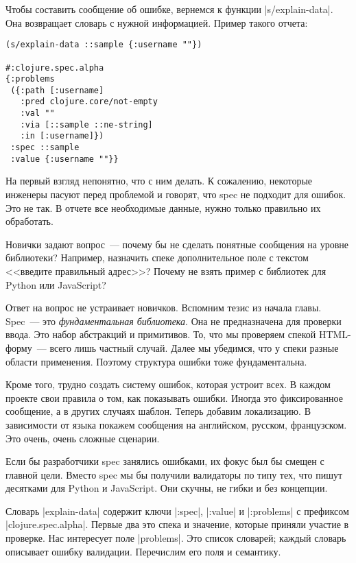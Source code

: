 Чтобы составить сообщение об ошибке, вернемся к функции \spverb|s/explain-data|.
Она возвращает словарь с нужной информацией. Пример такого отчета:

\begin{verbatim}
(s/explain-data ::sample {:username ""})

#:clojure.spec.alpha
{:problems
 ({:path [:username]
   :pred clojure.core/not-empty
   :val ""
   :via [::sample ::ne-string]
   :in [:username]})
 :spec ::sample
 :value {:username ""}}
\end{verbatim}

На первый взгляд непонятно, что с ним делать. К сожалению, некоторые инженеры
пасуют перед проблемой и говорят, что spec не подходит для ошибок. Это не так. В
отчете все необходимые данные, нужно только правильно их обработать.

Новички задают вопрос~--- почему бы не сделать понятные сообщения на уровне
библиотеки? Например, назначить спеке дополнительное поле с текстом <<введите
правильный адрес>>? Почему не взять пример с библиотек для Python или
JavaScript?

Ответ на вопрос не устраивает новичков. Вспомним тезис из начала главы. Spec~---
это \emph{фундаментальная библиотека}. Она не предназначена для проверки
ввода. Это набор абстракций и примитивов. То, что мы проверяем спекой
HTML-форму~--- всего лишь частный случай. Далее мы убедимся, что у спеки разные
области применения. Поэтому структура ошибки тоже фундаментальна.

Кроме того, трудно создать систему ошибок, которая устроит всех. В каждом
проекте свои правила о том, как показывать ошибки. Иногда это фиксированное
сообщение, а в других случаях шаблон. Теперь добавим локализацию. В зависимости
от языка покажем сообщения на английском, русском, французском. Это очень, очень
сложные сценарии.

Если бы разработчики spec занялись ошибками, их фокус был бы смещен с главной
цели. Вместо spec мы бы получили валидаторы по типу тех, что пишут десятками для
Python и JavaScript. Они скучны, не гибки и без концепции.

Словарь \spverb|explain-data| содержит ключи \spverb|:spec|, \spverb|:value| и
\spverb|:problems| с префиксом \spverb|clojure.spec.alpha|. Первые два это спека
и значение, которые приняли участие в проверке. Нас интересует поле
\spverb|problems|. Это список словарей; каждый словарь описывает ошибку
валидации. Перечислим его поля и семантику.


